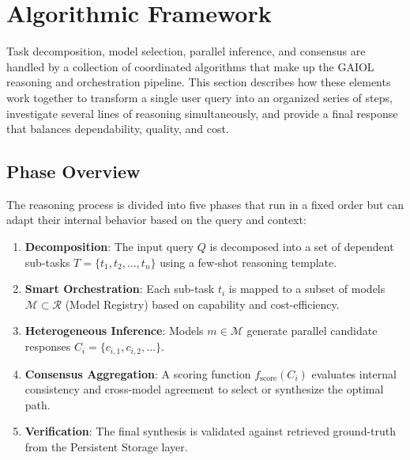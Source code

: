 
\section{Algorithmic Framework}
\label{sec:algorithms}

Task decomposition, model selection, parallel inference, and consensus are handled by a collection of coordinated algorithms that make up the GAIOL reasoning and orchestration pipeline. This section describes how these elements work together to transform a single user query into an organized series of steps, investigate several lines of reasoning simultaneously, and provide a final response that balances dependability, quality, and cost.

\subsection{Phase Overview}

The reasoning process is divided into five phases that run in a fixed order but can adapt their internal behavior based on the query and context:

\begin{enumerate}
    \item \textbf{Decomposition}: The input query $Q$ is decomposed into a set of dependent sub-tasks $T = \{t_1, t_2, \ldots, t_n\}$ using a few-shot reasoning template.
    \item \textbf{Smart Orchestration}: Each sub-task $t_i$ is mapped to a subset of models $\mathcal{M} \subset \mathcal{R}$ (Model Registry) based on capability and cost-efficiency.
    \item \textbf{Heterogeneous Inference}: Models $m \in \mathcal{M}$ generate parallel candidate responses $C_i = \{c_{i,1}, c_{i,2}, \ldots\}$.
    \item \textbf{Consensus Aggregation}: A scoring function $f_{\text{score}}(C_i)$ evaluates internal consistency and cross-model agreement to select or synthesize the optimal path.
    \item \textbf{Verification}: The final synthesis is validated against retrieved ground-truth from the Persistent Storage layer.
\end{enumerate}

